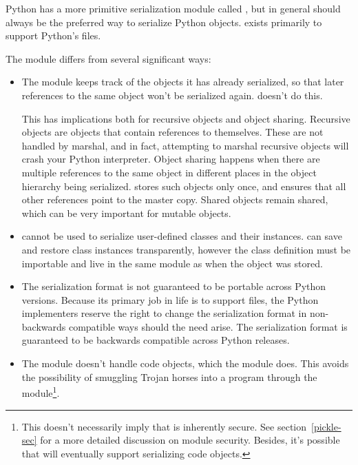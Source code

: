 Python has a more primitive serialization module called
, but in general
 should always be the preferred way to serialize Python
objects.   exists primarily to support Python's
 files.

The  module differs from  several
significant ways:

\begin{itemize}

\item The  module keeps track of the objects it has
      already serialized, so that later references to the same object
      won't be serialized again.   doesn't do this.

      This has implications both for recursive objects and object
      sharing.  Recursive objects are objects that contain references
      to themselves.  These are not handled by marshal, and in fact,
      attempting to marshal recursive objects will crash your Python
      interpreter.  Object sharing happens when there are multiple
      references to the same object in different places in the object
      hierarchy being serialized.   stores such objects
      only once, and ensures that all other references point to the
      master copy.  Shared objects remain shared, which can be very
      important for mutable objects.

\item {} cannot be used to serialize user-defined
      classes and their instances.   can save and
      restore class instances transparently, however the class
      definition must be importable and live in the same module as
      when the object was stored.

\item The  serialization format is not guaranteed to
      be portable across Python versions.  Because its primary job in
      life is to support  files, the Python implementers
      reserve the right to change the serialization format in
      non-backwards compatible ways should the need arise.  The
       serialization format is guaranteed to be
      backwards compatible across Python releases.

\item The  module doesn't handle code objects, which
      the  module does.  This avoids the possibility
      of smuggling Trojan horses into a program through the
       module\footnote{This doesn't necessarily imply
      that  is inherently secure.  See
      section~\ref{pickle-sec} for a more detailed discussion on
       module security.  Besides, it's possible that
       will eventually support serializing code
      objects.}.

\end{itemize}

